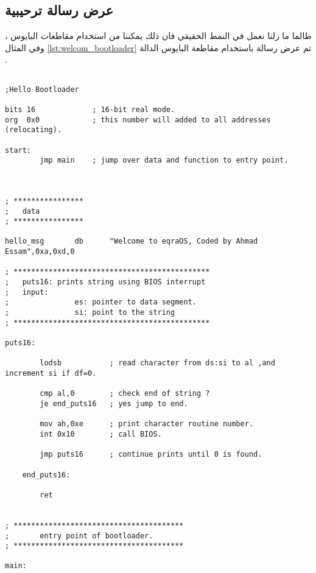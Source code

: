 \documentclass[document.tex]{subfiles}
\begin{document}
\subsection{عرض رسالة ترحيبية}
طالما ما زلنا نعمل في النمط الحقيقي فان ذلك يمكننا من استخدام مقاطعات البايوس ، وفي المثال \ref{lst:welcom_bootloader} تم  عرض رسالة باستخدام مقاطعة البايوس  الدالة  . 


\begin{english}

\lstset{numberstyle=\tiny,numbers=left,stepnumber=1,numbersep=5pt,tabsize=2,extendedchars=true,breaklines=true,frame=b,showspaces=false, showtabs=false,xleftmargin=10pt,framexleftmargin=10pt,framexrightmargin=5pt,framexbottommargin=4pt,showstringspaces=false,language=[x86masm]Assembler}

\begin{lstlisting}[label=lst:welcom_bootloader,caption=\en{Welcom to OS World}]

;Hello Bootloader

bits 16				; 16-bit real mode.
org	 0x0			; this number will added to all addresses (relocating).

start:
		jmp main	; jump over data and function to entry point.


		
; ****************
;	data
; ****************

hello_msg		db		"Welcome to eqraOS, Coded by Ahmad Essam",0xa,0xd,0

; *********************************************
;	puts16: prints string using BIOS interrupt
;   input:
;				es: pointer to data segment.
;				si: point to the string
; *********************************************

puts16:
		
		lodsb			; read character from ds:si to al ,and increment si if df=0.
		
		cmp al,0		; check end of string ?
		je end_puts16	; yes jump to end.
		
		mov ah,0xe		; print character routine number.
		int 0x10		; call BIOS.
		
		jmp puts16		; continue prints until 0 is found.
		
	end_puts16:
	
		ret				
		
		
; ***************************************
;		entry point of bootloader.
; ***************************************
		
main:				


\end{lstlisting}
\end{english}
\end{document}
